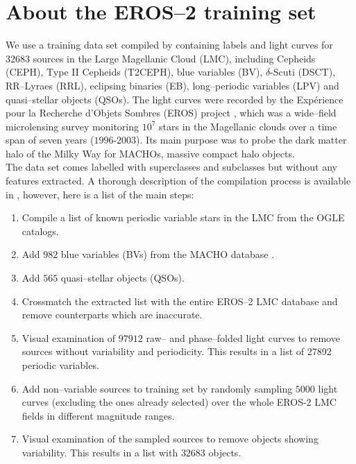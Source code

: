 \section{About the EROS--2 training set}
\label{sec:about-training-set}

We use a training data set compiled by \citet{kim2014} containing labels and light curves for $32683$ sources in the Large Magellanic Cloud (LMC), including Cepheids (CEPH), Type II Cepheids (T2CEPH), blue variables (BV), $\delta$-Scuti (DSCT), RR--Lyraes (RRL), eclipsing binaries (EB), long--periodic variables (LPV) and quasi--stellar objects (QSOs). The light curves were recorded by the Expérience pour la Recherche d’Objets Sombres (EROS) project \citep{tisserand2007}, which was a wide--field microlensing survey monitoring $10^7$ stars in the Magellanic clouds over a time span of seven years ($1996$-$2003$). Its main purpose was to probe the dark matter halo of the Milky Way for MACHOs, massive compact halo objects.\\

The data set comes labelled with superclasses and subclasses but without any features extracted. A thorough description of the compilation process is available in \citet{kim2014}, however, here is a list of the main steps:

\begin{enumerate}
\item Compile a list of known periodic variable stars in the LMC from the OGLE \citep{udalski2008, soszy2008} catalogs.
\item Add $982$ blue variables (BVs) from the MACHO database \citep{keller2002}.
\item Add $565$ quasi--stellar objects (QSOs).
\item Crossmatch the extracted list with the entire EROS--2 LMC database and remove counterparts which are inaccurate.
\item Visual examination of $97912$ raw-- and phase--folded light curves to remove sources without variability and periodicity. This results in a list of 27892 periodic variables.
\item Add non--variable sources to training set by randomly sampling $5000$ light curves (excluding the ones already selected) over the whole EROS-2 LMC fields in different magnitude ranges.
\item Visual examination of the sampled sources to remove objects showing variability. This results in a list with $32683$ objects.
\end{enumerate}

